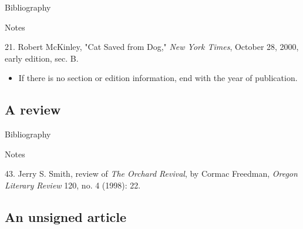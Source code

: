 \begin{center}{Bibliography}\end{center} 

\begin{singlespace}
\noindent{}
\end{singlespace}

\begin{center}{Notes}\end{center} 

\begin{singlespace}
\noindent\hspace{1.2cm}21. Robert McKinley,
"Cat Saved from Dog," \emph{New York Times}, October 28, 2000, early edition,
sec. B.
\end{singlespace}

\begin{itemize}\item If there is no section or edition information, end with the
year of publication.\end{itemize}

\subsection{A review}

\begin{center}{Bibliography}\end{center} 

\begin{singlespace}
\noindent{}
\end{singlespace}

\begin{center}{Notes}\end{center} 
\begin{singlespace}
\noindent\hspace{1.2cm}43. Jerry S. Smith,
review of \emph{The Orchard Revival}, by Cormac Freedman, \emph{Oregon Literary
Review} 120, no. 4 (1998): 22.
\end{singlespace}

\subsection{An unsigned article}

